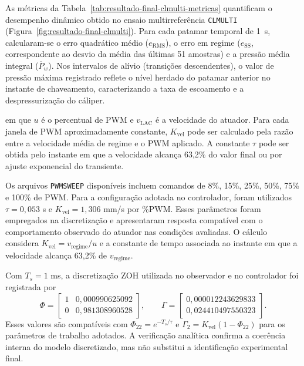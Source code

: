 As métricas da Tabela~\ref{tab:resultado-final-clmulti-metricas} quantificam o desempenho dinâmico obtido no ensaio multirreferência \texttt{CLMULTI} (Figura~\ref{fig:resultado-final-clmulti}). Para cada patamar temporal de 1~s, calcularam-se o erro quadrático médio ($e_{\mathrm{RMS}}$), o erro em regime ($e_{\mathrm{SS}}$, correspondente ao desvio da média das últimas 51 amostras) e a pressão média integral ($\overline{P}_w$). Nos intervalos de alívio (transições descendentes), o valor de pressão máxima registrado reflete o nível herdado do patamar anterior no instante de chaveamento, caracterizando a taxa de escoamento e a despressurização do cáliper.

em que $u$ é o percentual de \gls{PWM} e $v_{\mathrm{LAC}}$ é a velocidade do atuador. Para cada janela de \gls{PWM} aproximadamente constante, $K_{\mathrm{vel}}$ pode ser calculado pela razão entre a velocidade média de regime e o \gls{PWM} aplicado. A constante $\tau$ pode ser obtida pelo instante em que a velocidade alcança 63,2\% do valor final ou por ajuste exponencial do transiente.

Os arquivos \texttt{PWMSWEEP} disponíveis incluem comandos de 8\%, 15\%, 25\%, 50\%, 75\% e 100\% de \gls{PWM}. Para a configuração adotada no controlador, foram utilizados $\tau=0,053$ s e $K_{\mathrm{vel}}=1,306$ mm/s por \%PWM. Esses parâmetros foram empregados na discretização e apresentaram resposta compatível com o comportamento observado do atuador nas condições avaliadas. O cálculo considera $K_{\mathrm{vel}}=v_{\mathrm{regime}}/u$ e a constante de tempo associada ao instante em que a velocidade alcança 63,2\% de $v_{\mathrm{regime}}$.

Com $T_s=1$ ms, a discretização ZOH utilizada no observador e no controlador foi registrada por
\begin{equation}
    \Phi = \begin{bmatrix}
        1 & 0{,}000990625092 \\
        0 & 0{,}981308960528
    \end{bmatrix}, \qquad
    \Gamma = \begin{bmatrix}
        0{,}000012243629833 \\
        0{,}024410497550323
    \end{bmatrix}.
\end{equation}
Esses valores são compatíveis com $\Phi_{22}=e^{-T_s/\tau}$ e $\Gamma_2=K_{\mathrm{vel}}(1-\Phi_{22})$ para os parâmetros de trabalho adotados. A verificação analítica confirma a coerência interna do modelo discretizado, mas não substitui a identificação experimental final.


